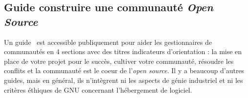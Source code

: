 


\subsection{Guide construire une communauté \textit{Open Source}}

Un guide~\cite{url_open_source_guide} est accessible publiquement pour aider les gestionnaires de communautés en 4 sections avec des titres indicateurs d’orientation : la mise en place de votre projet pour le succès, cultiver votre communauté, résoudre les conflits et la communauté est le coeur de l'\textit{open source}. Il y a beaucoup d'autres guides, mais en général, ils n'intègrent ni les aspects de génie industriel et ni les critères éthiques de GNU concernant l’hébergement de logiciel.



